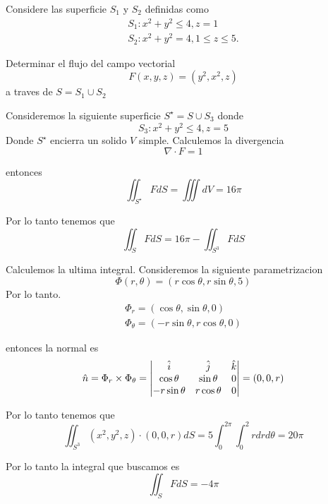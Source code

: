 \documentclass[../main.tex]{subfiles}
\begin{document}
\begin{problem}
  Considere las superficie $S_{1}$ y $S_{2}$ definidas como
  \begin{gather*}
    S_{1}: x^{2} + y^{2} \leq 4, z = 1\\
    S_{2}: x^{2} + y^{2} = 4, 1 \leq z \leq 5.
  \end{gather*}

  Determinar el flujo del campo vectorial
  \begin{equation*}
    F(x, y, z) = (y^{2}, x^{2}, z)
  \end{equation*}
  a traves de $S = S_{1} \cup S_{2}$
\end{problem}
\begin{solution}
  Consideremos la siguiente superficie $S^{\star} = S \cup S_{3}$ donde
  \begin{equation*}
    S_{3}: x^{2} + y^{2} \leq 4, z = 5
  \end{equation*}
  Donde $S^{\star}$ encierra un solido $V$ simple. Calculemos la divergencia
  \begin{equation*}
    \nabla \cdot F = 1
  \end{equation*}

  entonces
  \begin{equation*}
    \iint_{S^{\star}} F dS = \iiint dV = 16 \pi
  \end{equation*}

  Por lo tanto tenemos que
  \begin{equation*}
    \iint_{S} F dS = 16 \pi - \iint_{S^{3}} F dS
  \end{equation*}

  Calculemos la ultima integral. Consideremos la siguiente parametrizacion
  \begin{equation*}
    \Phi(r, \theta) = (r \cos \theta, r \sin \theta, 5)
  \end{equation*}
  Por lo tanto.
  \begin{gather*}
    \Phi_{r} = (\cos \theta, \sin \theta, 0)\\
    \Phi_{\theta} = (- r \sin \theta, r \cos \theta, 0)
  \end{gather*}

  entonces la normal es
  \begin{equation*}
    \hat{n} = \Phi_{r} \times \Phi_{\theta} = \begin{vmatrix} \hat{i} & \hat{j} & \hat{k}\\ \cos \theta & \sin \theta & 0\\ -r \sin \theta & r \cos \theta & 0\end{vmatrix} = (0, 0, r)
  \end{equation*}

  Por lo tanto tenemos que
  \begin{equation*}
    \iint_{S^{3}} (x^{2}, y^{2}, z) \cdot (0, 0, r) dS = 5 \int_{0}^{2\pi}\int_{0}^{2} r dr d \theta = 20 \pi
  \end{equation*}

  Por lo tanto la integral que buscamos es
  \begin{equation*}
    \iint_{S} F dS = -4 \pi
  \end{equation*}
\end{solution}
\end{document}
